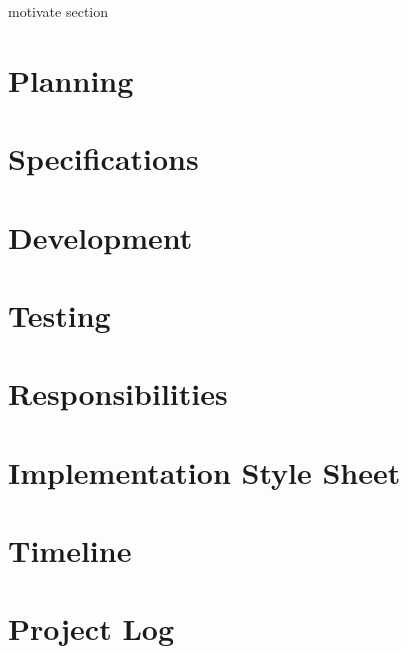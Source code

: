 motivate section

\section{Planning}
\section{Specifications}
\section{Development}
\section{Testing}
\section{Responsibilities}
\section{Implementation Style Sheet}
\section{Timeline}
\section{Project Log}
